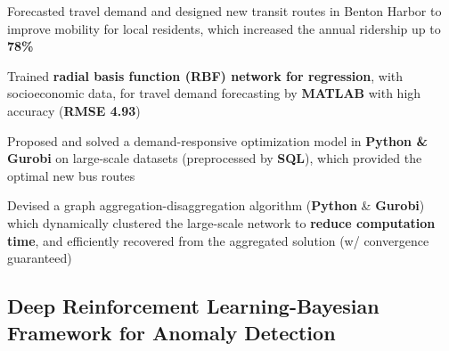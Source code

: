 \documentclass[]{Keval-resume}
\begin{document}
\begin{cvitems}
\item 
    {Forecasted travel demand and designed new transit routes in Benton Harbor to improve mobility for local residents, which increased the annual ridership up to \textbf{78\%}}
\item 
    {Trained \textbf{radial basis function (RBF) network for regression}, with socioeconomic data, for travel demand forecasting by \textbf{MATLAB} with high accuracy (\textbf{RMSE 4.93})}
\item 
    {Proposed and solved a demand-responsive optimization model in \textbf{Python \& Gurobi} on large-scale datasets (preprocessed by \textbf{SQL}), which provided the optimal new bus routes}
\item
    {Devised a graph aggregation-disaggregation algorithm (\textbf{Python} \& \textbf{Gurobi}) which dynamically clustered the large-scale network to \textbf{reduce computation time}, 
    and efficiently recovered from the aggregated solution (w/ convergence guaranteed)}
\end{cvitems}
\sectionsep

\subsection{Deep Reinforcement Learning-Bayesian Framework for Anomaly Detection \hfill\normalfont
}
\end{document}
